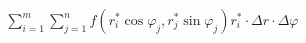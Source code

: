 \documentclass[preview]{standalone}
\begin{document}
\begin{align*}
\sum_{i=1}^m \sum_{j=1}^n f \left( r_i^* \cos \varphi_j, r_j^* \sin \varphi_j \right) r_i^* \cdot \Delta r \cdot \Delta \varphi
\end{align*}
\end{document}

